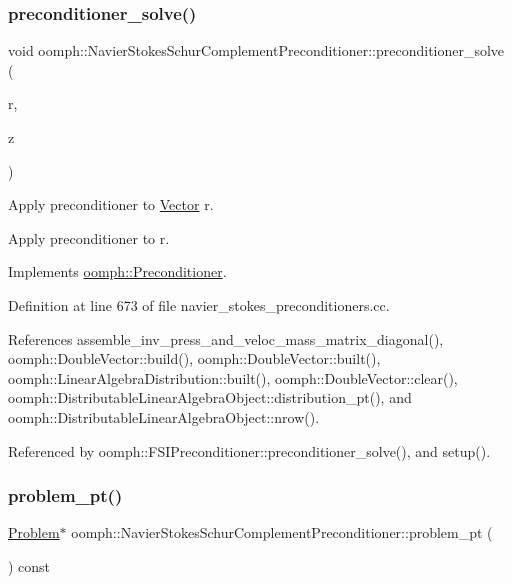 \subsubsection{\texorpdfstring{preconditioner\+\_\+solve()}{preconditioner\_solve()}}
{\footnotesize\ttfamily void oomph\+::\+Navier\+Stokes\+Schur\+Complement\+Preconditioner\+::preconditioner\+\_\+solve (\begin{DoxyParamCaption}\item[{const \hyperlink{classoomph_1_1DoubleVector}{Double\+Vector} \&}]{r,  }\item[{\hyperlink{classoomph_1_1DoubleVector}{Double\+Vector} \&}]{z }\end{DoxyParamCaption})\hspace{0.3cm}{\ttfamily [virtual]}}



Apply preconditioner to \hyperlink{classoomph_1_1Vector}{Vector} r. 

Apply preconditioner to r. 

Implements \hyperlink{classoomph_1_1Preconditioner_ace1199369e4465cd2b9a34884bb64ec8}{oomph\+::\+Preconditioner}.



Definition at line 673 of file navier\+\_\+stokes\+\_\+preconditioners.\+cc.



References assemble\+\_\+inv\+\_\+press\+\_\+and\+\_\+veloc\+\_\+mass\+\_\+matrix\+\_\+diagonal(), oomph\+::\+Double\+Vector\+::build(), oomph\+::\+Double\+Vector\+::built(), oomph\+::\+Linear\+Algebra\+Distribution\+::built(), oomph\+::\+Double\+Vector\+::clear(), oomph\+::\+Distributable\+Linear\+Algebra\+Object\+::distribution\+\_\+pt(), and oomph\+::\+Distributable\+Linear\+Algebra\+Object\+::nrow().



Referenced by oomph\+::\+F\+S\+I\+Preconditioner\+::preconditioner\+\_\+solve(), and setup().

\mbox{\label{classoomph_1_1NavierStokesSchurComplementPreconditioner_afc57fedbcd960d99c5ab3f135eacb612}} 
\subsubsection{\texorpdfstring{problem\+\_\+pt()}{problem\_pt()}}
{\footnotesize\ttfamily \hyperlink{classoomph_1_1Problem}{Problem}$\ast$ oomph\+::\+Navier\+Stokes\+Schur\+Complement\+Preconditioner\+::problem\+\_\+pt (\begin{DoxyParamCaption}{ }\end{DoxyParamCaption}) const\hspace{0.3cm}{\ttfamily [inline]}}



